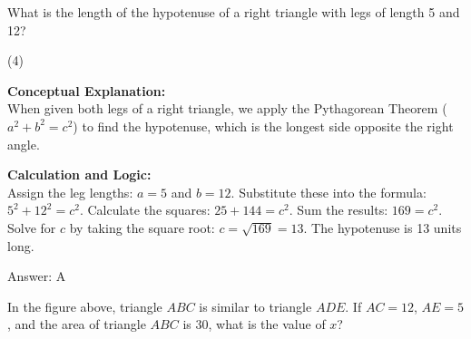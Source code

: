 \documentclass[11pt,paper=a4,answers]{exam}
\begin{document}
\begin{questions}
\question
\begin{center}
\end{center}
What is the length of the hypotenuse of a right triangle with legs of length 5 and 12?
\begin{tasks}(4)
\end{tasks}

\begin{solution}
\textbf{Conceptual Explanation:} \\
When given both legs of a right triangle, we apply the Pythagorean Theorem ($a^2 + b^2 = c^2$) to find the hypotenuse, which is the longest side opposite the right angle.

\vspace{30pt}

\textbf{Calculation and Logic:} \\
Assign the leg lengths: $a = 5$ and $b = 12$. Substitute these into the formula: $5^2 + 12^2 = c^2$. Calculate the squares: $25 + 144 = c^2$. Sum the results: $169 = c^2$. Solve for $c$ by taking the square root: $c = \sqrt{169} = 13$. The hypotenuse is 13 units long.

\vspace{30pt}

Answer: \colorbox{yellow!100}{A}
\end{solution}

\vspace{60pt}

\question
\begin{center}
\end{center}
In the figure above, triangle $ABC$ is similar to triangle $ADE$. If $AC = 12$, $AE = 5$, and the area of triangle $ABC$ is 30, what is the value of $x$?


\end{questions}
\end{document}
